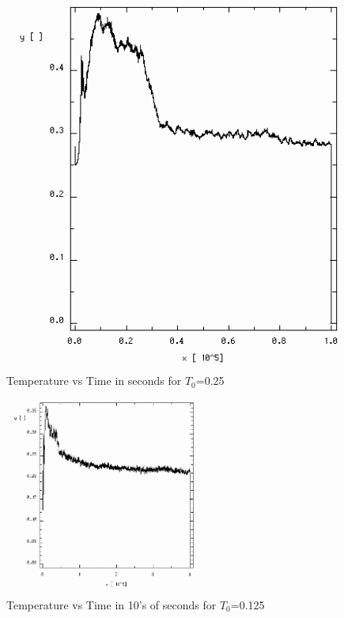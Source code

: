 \documentclass{article}
\begin{document}
\begin{multicols}{2}
\begin{figure}
\centering
\includegraphics[width=\linewidth]{./imgs/temp_25}
\caption{Temperature vs Time in seconds for $T_0$=0.25}
\label{fig:temp7}
\end{figure}

\end{multicols}

\begin{figure}[h!]
\centering
\includegraphics[width=2.5in]{./imgs/temp_125longer}
\caption{Temperature vs Time in 10's of seconds for $T_0$=0.125}
\label{fig:temp8}
\end{figure}
\end{document}
